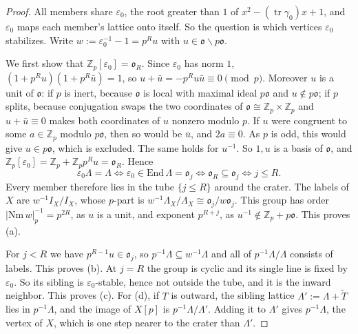 \documentclass[11pt]{amsart}
\numberwithin{equation}{section}
\theoremstyle{plain}
\theoremstyle{definition}
\theoremstyle{remark}
\begin{document}
\begin{proof}
All members share \(\varepsilon_0\), the root greater than \(1\) of \(x^2-(\operatorname{tr}\gamma_0)x+1\), and \(\varepsilon_0\) maps each member's lattice onto itself. So the question is which vertices \(\varepsilon_0\) stabilizes. Write \(w:=\varepsilon_0^{-1}-1=p^Ru\) with \(u\in\mathfrak o\smallsetminus p\mathfrak o\).

We first show that \(\mathbb Z_p[\varepsilon_0]=\mathfrak o_R\). Since \(\varepsilon_0\) has norm \(1\), \((1+p^Ru)(1+p^R\bar u)=1\), so \(u+\bar u=-p^Ru\bar u\equiv0\pmod p\). Moreover \(u\) is a unit of \(\mathfrak o\): if \(p\) is inert, because \(\mathfrak o\) is local with maximal ideal \(p\mathfrak o\) and \(u\notin p\mathfrak o\); if \(p\) splits, because conjugation swaps the two coordinates of \(\mathfrak o\cong\mathbb Z_p\times\mathbb Z_p\) and \(u+\bar u\equiv0\) makes both coordinates of \(u\) nonzero modulo \(p\). If \(u\) were congruent to some \(a\in\mathbb Z_p\) modulo \(p\mathfrak o\), then so would be \(\bar u\), and \(2a\equiv0\). As \(p\) is odd, this would give \(u\in p\mathfrak o\), which is excluded. The same holds for \(u^{-1}\). So \(1,u\) is a basis of \(\mathfrak o\), and \(\mathbb Z_p[\varepsilon_0]=\mathbb Z_p+\mathbb Z_pp^Ru=\mathfrak o_R\). Hence
\[\varepsilon_0\Lambda=\Lambda\iff\varepsilon_0\in\mathrm{End}\,\Lambda=\mathfrak o_j\iff\mathfrak o_R\subseteq\mathfrak o_j\iff j\le R .\]
Every member therefore lies in the tube \(\{j\le R\}\) around the crater. The labels of \(X\) are \(w^{-1}I_X/I_X\), whose \(p\)-part is \(w^{-1}\Lambda_X/\Lambda_X\cong\mathfrak o_j/w\mathfrak o_j\). This group has order \(|\mathrm{Nm}\,w|_p^{-1}=p^{2R}\), as \(u\) is a unit, and exponent \(p^{R+j}\), as \(u^{-1}\notin\mathbb Z_p+p\mathfrak o\). This proves (a).

For \(j<R\) we have \(p^{R-1}u\in\mathfrak o_j\), so \(p^{-1}\Lambda\subseteq w^{-1}\Lambda\) and all of \(p^{-1}\Lambda/\Lambda\) consists of labels. This proves (b). At \(j=R\) the group is cyclic and its single line is fixed by \(\varepsilon_0\). So its sibling is \(\varepsilon_0\)-stable, hence not outside the tube, and it is the inward neighbor. This proves (c). For (d), if \(T\) is outward, the sibling lattice \(\Lambda':=\Lambda+\widetilde T\) lies in \(p^{-1}\Lambda\), and the image of \(X[p]\) is \(p^{-1}\Lambda/\Lambda'\). Adding it to \(\Lambda'\) gives \(p^{-1}\Lambda\), the vertex of \(X\), which is one step nearer to the crater than \(\Lambda'\).
\end{proof}
\end{document}
